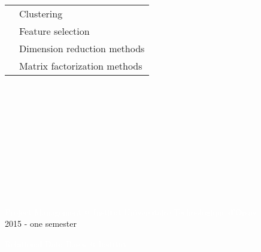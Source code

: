 \documentclass[letterpaper]{article}
\begin{document}
\begin{minipage}{1.\linewidth}
{\begin{minipage}{0.47\linewidth}
\begin{minipage}{1\linewidth}
\begin{minipage}{0.47\linewidth}
			\begin{minipage}{1\linewidth}
				\small\textcolor{white}{
				\begin{tabularx}{1\textwidth}{cX}
					& Clustering\\
					& Feature selection\\
					& Dimension reduction methods\\
					& Matrix factorization methods\\
				\end{tabularx}
				} 
			\end{minipage}
			\vspace{2ex}
		\end{minipage}
		\hfill
		\begin{minipage}{0.47\linewidth}
			\centering{\Large\textmd{\textcolor{white}{Software Development}}}\\
		\end{minipage}
	\end{minipage}\\
	\begin{minipage}{1\linewidth} %
		\begin{minipage}{0.47\linewidth}
		\centering{\Large\textmd{\textcolor{white}{Data Visualization}}}\\
		\vspace{1ex}
		\end{minipage}
		\hfill
		\begin{minipage}{0.47\linewidth}
		\centering{\Large\textmd{\textcolor{white}{Development}}}\\
		\vspace{1ex}
		\end{minipage}\\ 
	\end{minipage} %
	\begin{minipage}{1\linewidth} %
		\centering{\huge\textmd{\textcolor{white}{Teaching}}}\\
		\vspace{2ex}
		\begin{minipage}{0.9\linewidth}
			{\normalsize \textcolor{white}{Project Management @ Institut 
			Universitaire Technologique d'Orsay}}\\
			{\small\textcolor{gray!40}{2015 - one semester}}\\
		\end{minipage} 
		\begin{minipage}{0.9\linewidth}
			{\normalsize \textcolor{white}{Relational Data Bases @ Institut 
}}
\end{minipage}
\end{minipage}
\end{minipage}}
\end{minipage}
\end{document}
